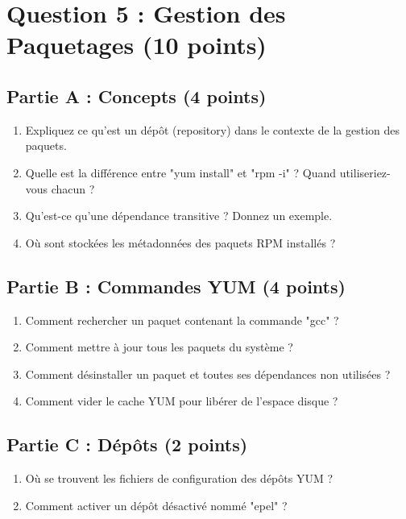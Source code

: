 \documentclass[12pt,a4paper]{article}
\begin{document}

\section{Question 5 : Gestion des Paquetages (10 points)}

\begin{questionbox}
\subsection*{Partie A : Concepts (4 points)}
\begin{enumerate}[label=\alph*)]
    \item Expliquez ce qu'est un dépôt (repository) dans le contexte de la gestion des paquets.
    \item Quelle est la différence entre "yum install" et "rpm -i" ? Quand utiliseriez-vous chacun ?
    \item Qu'est-ce qu'une dépendance transitive ? Donnez un exemple.
    \item Où sont stockées les métadonnées des paquets RPM installés ?
\end{enumerate}

\subsection*{Partie B : Commandes YUM (4 points)}
\begin{enumerate}[label=\alph*)]
    \item Comment rechercher un paquet contenant la commande "gcc" ?
    \item Comment mettre à jour tous les paquets du système ?
    \item Comment désinstaller un paquet et toutes ses dépendances non utilisées ?
    \item Comment vider le cache YUM pour libérer de l'espace disque ?
\end{enumerate}

\subsection*{Partie C : Dépôts (2 points)}
\begin{enumerate}[label=\alph*)]
    \item Où se trouvent les fichiers de configuration des dépôts YUM ?
    \item Comment activer un dépôt désactivé nommé "epel" ?
\end{enumerate}
\end{questionbox}
\end{document}
